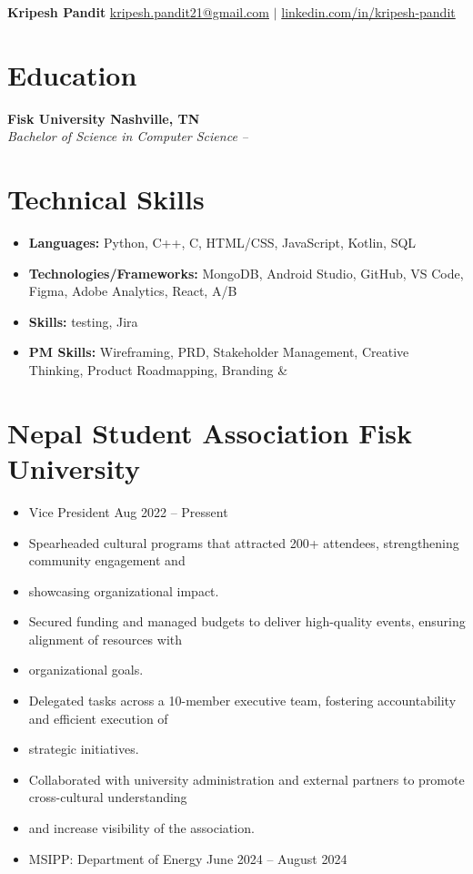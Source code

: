 \documentclass[letterpaper,11pt]{article}
\begin{document}
{\LARGE\bfseries Kripesh Pandit} \hfill
\small
\href{mailto:kripesh.pandit21@gmail.com}{kripesh.pandit21@gmail.com} $|$ \href{https://linkedin.com/in/kripesh-pandit}{linkedin.com/in/kripesh-pandit}
\section{Education}
\textbf{Fisk University Nashville, TN} \hfill  \\
\textit{Bachelor of Science in Computer Science} \hfill \textit{ -- }
\vspace{2pt}







\section{Technical Skills}
\begin{itemize}[label={}]
  \item \textbf{Languages:} Python, C++, C, HTML/CSS, JavaScript, Kotlin, SQL
  \item \textbf{Technologies/Frameworks:} MongoDB, Android Studio, GitHub, VS Code, Figma, Adobe Analytics, React, A/B
  \item \textbf{Skills:} testing, Jira
  \item \textbf{PM Skills:} Wireframing, PRD, Stakeholder Management, Creative Thinking, Product Roadmapping, Branding \&
\end{itemize}






\section{Nepal Student Association Fisk University}
\begin{itemize}
  \item Vice President Aug 2022 – Pressent
  \item Spearheaded cultural programs that attracted 200+ attendees, strengthening community engagement and
  \item showcasing organizational impact.
  \item Secured funding and managed budgets to deliver high-quality events, ensuring alignment of resources with
  \item organizational goals.
  \item Delegated tasks across a 10-member executive team, fostering accountability and efficient execution of
  \item strategic initiatives.
  \item Collaborated with university administration and external partners to promote cross-cultural understanding
  \item and increase visibility of the association.
  \item MSIPP: Department of Energy June 2024 – August 2024
\end{itemize}
\end{document}
